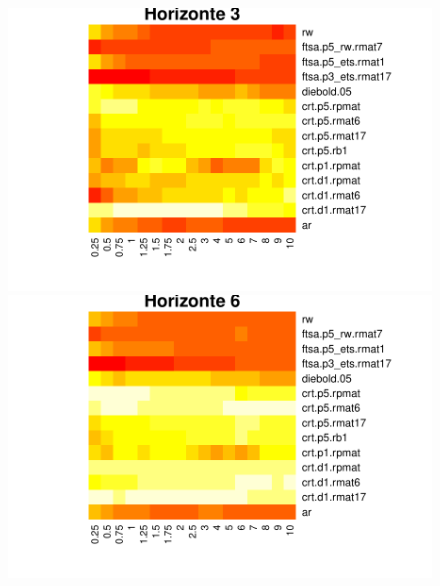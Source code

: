 \documentclass[
	12pt,				%
	openright,			%
	oneside,			%
	a4paper,			%
	english,			%
	brazil				%
	]{dissertacao-ufrgs-abntex2}
\begin{document}
\begin{figure}[htp]
\begin{minipage}[t]{0.45\linewidth}
\begin{minipage}[t]{\linewidth}
    \end{minipage}
    \begin{minipage}[b]{\linewidth}
      \centering     \includegraphics[width=\textwidth]{anexos/heatmap3.pdf} 
    \end{minipage}
  \end{minipage}
  \begin{minipage}[t]{0.45\linewidth}
    \centering
    \begin{minipage}[t]{\linewidth}
      \centering     \includegraphics[width=\textwidth]{anexos/heatmap6.pdf}
	

\end{minipage}
\end{minipage}
\end{figure}
\end{document}
